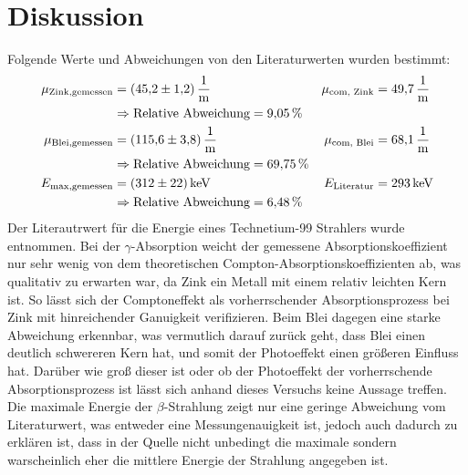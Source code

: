 \section{Diskussion}
\label{sec:Diskussion}
Folgende Werte und Abweichungen von den Literaturwerten wurden bestimmt:
\begin{align*}
  \mu_\text{Zink,gemessen} &= \SI{45.2 \pm 1.2}{\per\metre} & \mu_\text{com, Zink} &= \SI{49.7}{\per\metre} \\
  & \Rightarrow \text{Relative Abweichung} = \SI{9.05}{\percent} \\
  \mu_\text{Blei,gemessen} &= \SI{115.6 \pm 3.8}{\per\metre} & \mu_\text{com, Blei} &=  \SI{68.1}{\per\metre} \\
  & \Rightarrow \text{Relative Abweichung} = \SI{69.75}{\percent} \\
  E_\text{max,gemessen} &=  \SI{312\pm22}{\kilo\electronvolt} & E_\text{Literatur} &=  \SI{293}{\kilo\electronvolt} \\
  & \Rightarrow \text{Relative Abweichung} = \SI{6.48}{\percent} 
\end{align*}
Der Literautrwert für die Energie eines Technetium-99 Strahlers wurde \cite{99Tc} entnommen.
Bei der $\gamma$-Absorption weicht der gemessene Absorptionskoeffizient nur sehr wenig von dem
theoretischen Compton-Absorptionskoeffizienten ab, was qualitativ zu erwarten war, da Zink ein Metall mit einem relativ leichten Kern ist. So lässt sich der
Comptoneffekt als vorherrschender Absorptionsprozess bei Zink mit hinreichender Ganuigkeit verifizieren. Beim Blei dagegen eine starke Abweichung erkennbar,
was vermutlich darauf zurück geht, dass Blei einen deutlich schwereren Kern hat, und somit der Photoeffekt einen größeren Einfluss hat. Darüber wie groß dieser ist
oder ob der Photoeffekt der vorherrschende Absorptionsprozess ist lässt sich anhand dieses Versuchs keine Aussage treffen. Die maximale Energie der $\beta$-Strahlung zeigt
nur eine geringe Abweichung vom Literaturwert, was entweder eine Messungenauigkeit ist, jedoch auch dadurch zu erklären ist, dass in der Quelle nicht unbedingt die maximale
sondern warscheinlich eher die mittlere Energie der Strahlung angegeben ist.
